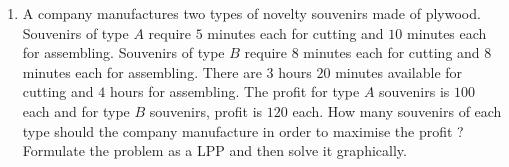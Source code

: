 \begin{enumerate}
\item A company manufactures two types of novelty souvenirs made of plywood. Souvenirs of type $A$ require $5$ minutes each for cutting and $10$ minutes each for assembling. Souvenirs of type $B$ require $8$ minutes each for cutting and $8$ minutes each for assembling. There are $3$ hours $20$ minutes available for cutting and $4$ hours for assembling. The profit for type $A$ souvenirs is \rupee$100$ each and for type $B$ souvenirs, profit is \rupee$120$ each. How many souvenirs of each type should the company manufacture in order to maximise the profit ? Formulate the problem as a LPP and then solve it graphically.	

\end{enumerate}
